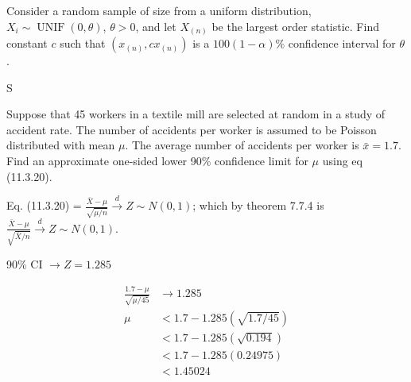 \documentclass[answers]{exam}
\begin{document}
\begin{questions}
\question 
Consider a random sample of size from a uniform distribution,
\(X_i\sim\operatorname{UNIF}(0,\theta)\), \(\theta>0\),
and let \(X_{(n)}\) be the largest order statistic. 
Find constant \(c\) such that \((x_{(n)},cx_{(n)})\) is a \(100(1-\alpha)\%\) 
confidence interval for \(\theta\).
\begin{solution}
	S
\end{solution}

\question 
Suppose that 45 workers in a textile mill are selected at random in a study of accident rate. 
The number of accidents per worker is assumed to be Poisson distributed with mean \(\mu\). 
The average number of accidents per worker is \(\bar{x}=1.7\).
Find an approximate one-sided lower 90\% confidence limit for \(\mu\) 
using eq (11.3.20).
\begin{solution}
	Eq. (11.3.20) = \(\frac{\bar{X}-\mu}{\sqrt{\mu/n}}\overset{d}{\rightarrow} Z\sim N(0,1)\); 
	which by theorem 7.7.4 is 
	\(\frac{\bar{X}-\mu}{\sqrt{\bar{X}/n}}\overset{d}{\rightarrow} Z\sim N(0,1)\).
	
	90\% CI $\rightarrow Z = 1.285$ 
	
	\begin{align*}
		\frac{1.7-\mu}{\sqrt{\mu/45}} &\rightarrow 1.285 \\
		\mu &< 1.7-1.285(\sqrt{1.7/45}) \\
		&< 1.7-1.285(\sqrt{0.194}) \\
		&< 1.7-1.285(0.24975) \\
		&< 1.45024
	\end{align*}
\end{solution}


\end{questions}
\end{document}
